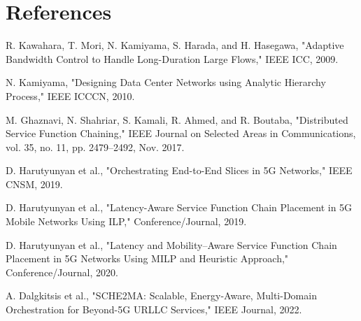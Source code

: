 \documentclass[conference]{IEEEtran}
\begin{document}
\section{References}

\begin{thebibliography}{99}

R. Kawahara, T. Mori, N. Kamiyama, S. Harada, and H. Hasegawa,  
"Adaptive Bandwidth Control to Handle Long-Duration Large Flows,"  
IEEE ICC, 2009.

N. Kamiyama,  
"Designing Data Center Networks using Analytic Hierarchy Process,"  
IEEE ICCCN, 2010.

M. Ghaznavi, N. Shahriar, S. Kamali, R. Ahmed, and R. Boutaba,  
"Distributed Service Function Chaining,"  
IEEE Journal on Selected Areas in Communications, vol. 35, no. 11, pp. 2479–2492, Nov. 2017.

D. Harutyunyan et al.,  
"Orchestrating End-to-End Slices in 5G Networks,"  
IEEE CNSM, 2019.

D. Harutyunyan et al.,  
"Latency-Aware Service Function Chain Placement in 5G Mobile Networks Using ILP,"  
Conference/Journal, 2019.

D. Harutyunyan et al.,  
"Latency and Mobility–Aware Service Function Chain Placement in 5G Networks Using MILP and Heuristic Approach,"  
Conference/Journal, 2020.

A. Dalgkitsis et al.,  
"SCHE2MA: Scalable, Energy-Aware, Multi-Domain Orchestration for Beyond-5G URLLC Services,"  
IEEE Journal, 2022.

\end{thebibliography}
\end{document}
